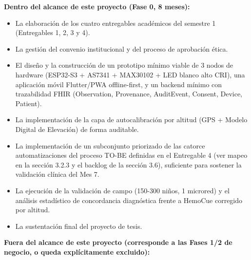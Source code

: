 \documentclass[11pt,a4paper]{article}
\providecommand{\tightlist}{%
  \setlength{\itemsep}{0pt}\setlength{\parskip}{0pt}}
\begin{document}
\textbf{Dentro del alcance de este proyecto (Fase 0, 8 meses):}

\begin{itemize}
\tightlist
\item
  La elaboración de los cuatro entregables académicos del semestre 1 (Entregables 1, 2, 3 y 4).
\item
  La gestión del convenio institucional y del proceso de aprobación ética.
\item
  El diseño y la construcción de un prototipo mínimo viable de 3 nodos de hardware (ESP32-S3 + AS7341 + MAX30102 + LED blanco alto CRI), una aplicación móvil Flutter/PWA offline-first, y un backend mínimo con trazabilidad FHIR (Observation, Provenance, AuditEvent, Consent, Device, Patient).
\item
  La implementación de la capa de autocalibración por altitud (GPS + Modelo Digital de Elevación) de forma auditable.
\item
  La implementación de un subconjunto priorizado de las catorce automatizaciones del proceso TO-BE definidas en el Entregable 4 (ver mapeo en la sección 3.2.3 y el backlog de la sección 3.6), suficiente para sostener la validación clínica del Mes 7.
\item
  La ejecución de la validación de campo (150-300 niños, 1 microred) y el análisis estadístico de concordancia diagnóstica frente a HemoCue corregido por altitud.
\item
  La sustentación final del proyecto de tesis.
\end{itemize}

\textbf{Fuera del alcance de este proyecto (corresponde a las Fases 1/2 de negocio, o queda explícitamente excluido):}
\end{document}
